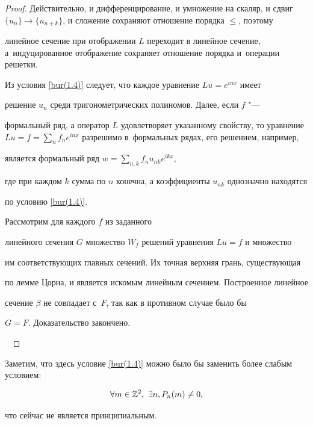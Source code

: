 \smallskip

\begin{proof}

Действительно, и дифференцирование, и умножение на скаляр, и сдвиг $\{ u_n \}

\to \{ u_{n + k} \}$, и сложение сохраняют отношение порядка $\le$, поэтому

линейное сечение при отображении $L$ переходит в линейное сечение, а~индуцированное отображение сохраняет отношение порядка и~операции решетки.

Из условия \eqref{bur(1.4)} следует, что каждое уравнение $L u = e^{i n x}$ имеет

решение $u_n$ среди тригонометрических полиномов. Далее, если $f$ "---

формальный ряд, а оператор $L$ удовлетворяет указанному свойству, то уравнение $L u = f =

\sum_n f_n e^{i n x}$ разрешимо в~формальных рядах, его решением, например,

является формальный ряд $w = \sum_{n, k} f_n u_{n k} e^{i k x}$, 

где при каждом $k$ сумма по $n$ конечна, а коэффициенты $u_{nk}$ однозначно находятся

по условию \eqref{bur(1.4)}.



Рассмотрим для каждого $f$ из заданного

линейного сечения $G$ множество $W_f$ решений уравнения $L u = f$ и множество

им соответствующих главных сечений. Их точная верхняя грань, существующая

по лемме Цорна, и является искомым линейным сечением. Построенное линейное

сечение $\beta$ не совпадает с~$F$, так как в противном случае было бы

$G = F$. Доказательство закончено.



\hfill~\end{proof}



\smallskip



Заметим, что здесь условие \eqref{bur(1.4)} можно было бы заменить более слабым условием: 

$$\forall m \in {\Bbb Z}^2, \,\, \exists n, P_n (m) \not= 0,$$

что сейчас не является принципиальным.

